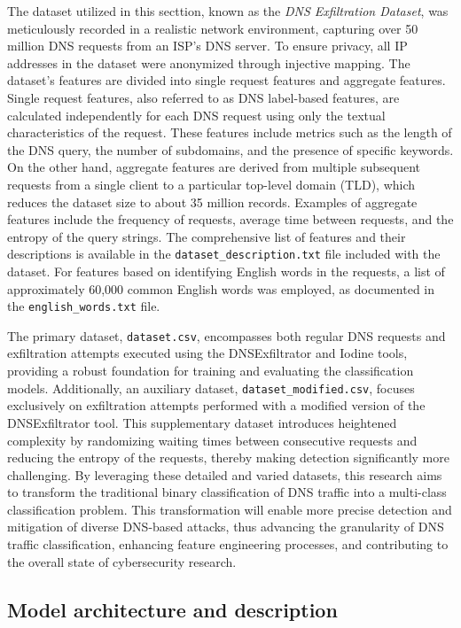 The dataset utilized in this secttion, known as the \textit{DNS Exfiltration Dataset}, was meticulously recorded in a realistic network environment, capturing over 50 million DNS requests from an ISP's DNS server. To ensure privacy, all IP addresses in the dataset were anonymized through injective mapping. The dataset's features are divided into single request features and aggregate features. Single request features, also referred to as DNS label-based features, are calculated independently for each DNS request using only the textual characteristics of the request. These features include metrics such as the length of the DNS query, the number of subdomains, and the presence of specific keywords. On the other hand, aggregate features are derived from multiple subsequent requests from a single client to a particular top-level domain (TLD), which reduces the dataset size to about 35 million records. Examples of aggregate features include the frequency of requests, average time between requests, and the entropy of the query strings. The comprehensive list of features and their descriptions is available in the \texttt{dataset\_description.txt} file included with the dataset. For features based on identifying English words in the requests, a list of approximately 60,000 common English words was employed, as documented in the \texttt{english\_words.txt} file.

The primary dataset, \texttt{dataset.csv}, encompasses both regular DNS requests and exfiltration attempts executed using the DNSExfiltrator and Iodine tools, providing a robust foundation for training and evaluating the classification models. Additionally, an auxiliary dataset, \texttt{dataset\_modified.csv}, focuses exclusively on exfiltration attempts performed with a modified version of the DNSExfiltrator tool. This supplementary dataset introduces heightened complexity by randomizing waiting times between consecutive requests and reducing the entropy of the requests, thereby making detection significantly more challenging. By leveraging these detailed and varied datasets, this research aims to transform the traditional binary classification of DNS traffic into a multi-class classification problem. This transformation will enable more precise detection and mitigation of diverse DNS-based attacks, thus advancing the granularity of DNS traffic classification, enhancing feature engineering processes, and contributing to the overall state of cybersecurity research.


\subsection{Model architecture and description}


